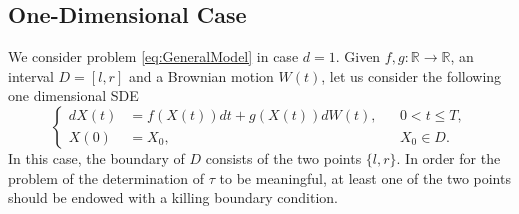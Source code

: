\subsection{One-Dimensional Case}
We consider problem \eqref{eq:GeneralModel} in case $d = 1$. Given $f,g \colon \mathbb{R} \rightarrow \mathbb{R}$, an interval $D = \left[l,r\right]$ and a Brownian motion $W(t)$, let us consider the following one dimensional SDE
\begin{equation}\label{eq:OneDModel}
\left \{
\begin{aligned}
	dX(t) &= f(X(t)) dt + g(X(t))dW(t), && 0 < t \leq T, \\
	X(0)  &= X_0, && X_0 \in D.
\end{aligned} \right .
\end{equation}
In this case, the boundary of $D$ consists of the two points $\{l,r\}$. In order for the problem of the determination of $\tau$ to be meaningful, at least one of the two points should be endowed with a killing boundary condition. 



